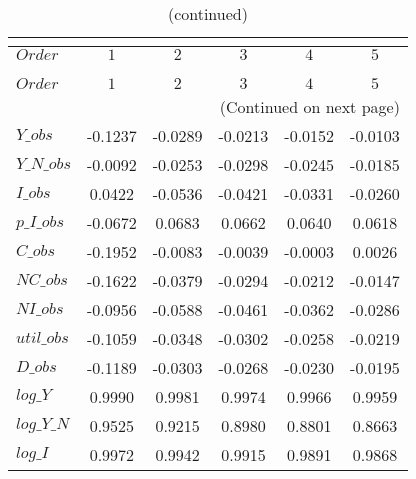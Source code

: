  
\begin{center}
\begin{longtable}{lccccc} 
\caption{COEFFICIENTS OF AUTOCORRELATION}\\
 \label{Table:th_autocorr_matrix}\\
\toprule 
$Order      $	 & 	 $          1$	 & 	 $          2$	 & 	 $          3$	 & 	 $          4$	 & 	 $          5$\\
\midrule \endfirsthead 
\caption{(continued)}\\
 \toprule \\ 
$Order      $	 & 	 $          1$	 & 	 $          2$	 & 	 $          3$	 & 	 $          4$	 & 	 $          5$\\
\midrule \endhead 
\midrule \multicolumn{6}{r}{(Continued on next page)} \\ \bottomrule \endfoot 
\bottomrule \endlastfoot 
$Y\_obs     $	 & 	    -0.1237	 & 	    -0.0289	 & 	    -0.0213	 & 	    -0.0152	 & 	    -0.0103 \\ 
$Y\_N\_obs  $	 & 	    -0.0092	 & 	    -0.0253	 & 	    -0.0298	 & 	    -0.0245	 & 	    -0.0185 \\ 
$I\_obs     $	 & 	     0.0422	 & 	    -0.0536	 & 	    -0.0421	 & 	    -0.0331	 & 	    -0.0260 \\ 
$p\_I\_obs  $	 & 	    -0.0672	 & 	     0.0683	 & 	     0.0662	 & 	     0.0640	 & 	     0.0618 \\ 
$C\_obs     $	 & 	    -0.1952	 & 	    -0.0083	 & 	    -0.0039	 & 	    -0.0003	 & 	     0.0026 \\ 
$NC\_obs    $	 & 	    -0.1622	 & 	    -0.0379	 & 	    -0.0294	 & 	    -0.0212	 & 	    -0.0147 \\ 
$NI\_obs    $	 & 	    -0.0956	 & 	    -0.0588	 & 	    -0.0461	 & 	    -0.0362	 & 	    -0.0286 \\ 
$util\_obs  $	 & 	    -0.1059	 & 	    -0.0348	 & 	    -0.0302	 & 	    -0.0258	 & 	    -0.0219 \\ 
$D\_obs     $	 & 	    -0.1189	 & 	    -0.0303	 & 	    -0.0268	 & 	    -0.0230	 & 	    -0.0195 \\ 
$log\_Y     $	 & 	     0.9990	 & 	     0.9981	 & 	     0.9974	 & 	     0.9966	 & 	     0.9959 \\ 
$log\_Y\_N  $	 & 	     0.9525	 & 	     0.9215	 & 	     0.8980	 & 	     0.8801	 & 	     0.8663 \\ 
$log\_I     $	 & 	     0.9972	 & 	     0.9942	 & 	     0.9915	 & 	     0.9891	 & 	     0.9868 \\ 

\end{longtable}
\end{center}
